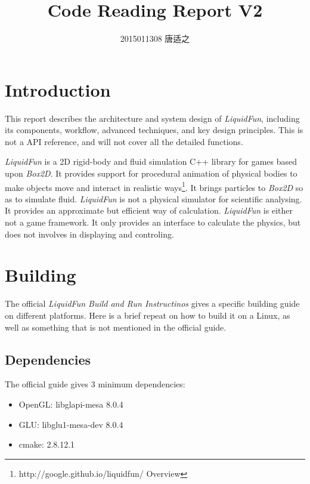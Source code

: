 \documentclass[UTF8]{ctexart}
\title{\huge Code Reading Report V2}
\author{\large 2015011308 唐适之}
\date{}
\begin{document}
    
    \maketitle

    \tableofcontents

    \section{Introduction}

        This report describes the architecture and system design of \textit{LiquidFun}, including its components, workflow, advanced techniques, and key design principles. This is not a API reference, and will not cover all the detailed functions.

        \textit{LiquidFun} is a 2D rigid-body and fluid simulation C++ library for games based upon \textit{Box2D}. It provides support for procedural animation of physical bodies to make objects move and interact in realistic ways\footnote{http://google.github.io/liquidfun/ Overview}. It brings particles to \textit{Box2D} so as to simulate fluid. \textit{LiquidFun} is not a physical simulator for scientific analysing. It provides an approximate but efficient way of calculation. \textit{LiquidFun} is either not a game framework. It only provides an interface to calculate the physics, but does not involves in displaying and controling.

    \section{Building}
        
        The official \textit{LiquidFun Build and Run Instructinos} gives a specific building guide on different platforms. Here is a brief repeat on how to build it on a Linux, as well as something that is not mentioned in the official guide.

        \subsection{Dependencies}

            The official guide gives 3 minimum dependencies:
            
            \begin{itemize}
                \item OpenGL: libglapi-mesa 8.0.4
                \item GLU: libglu1-mesa-dev 8.0.4
                \item cmake: 2.8.12.1
            \end{itemize}
\end{document}
